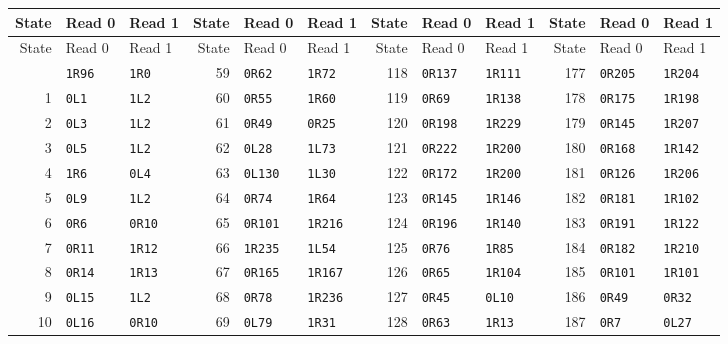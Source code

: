 \begingroup\footnotesize
\renewcommand{\arraystretch}{0.93}
\setlength{\tabcolsep}{4.5pt}
\begin{longtable}{rllrllrllrll}
\toprule
State & Read 0 & Read 1 & State & Read 0 & Read 1 & State & Read 0 & Read 1 & State & Read 0 & Read 1\\
\midrule
\endfirsthead
\toprule
State & Read 0 & Read 1 & State & Read 0 & Read 1 & State & Read 0 & Read 1 & State & Read 0 & Read 1\\
\midrule
\endhead
\bottomrule
\endfoot
0 & \texttt{1R96} & \texttt{1R0} & 59 & \texttt{0R62} & \texttt{1R72} & 118 & \texttt{0R137} & \texttt{1R111} & 177 & \texttt{0R205} & \texttt{1R204}\\
1 & \texttt{0L1} & \texttt{1L2} & 60 & \texttt{0R55} & \texttt{1R60} & 119 & \texttt{0R69} & \texttt{1R138} & 178 & \texttt{0R175} & \texttt{1R198}\\
2 & \texttt{0L3} & \texttt{1L2} & 61 & \texttt{0R49} & \texttt{0R25} & 120 & \texttt{0R198} & \texttt{1R229} & 179 & \texttt{0R145} & \texttt{1R207}\\
3 & \texttt{0L5} & \texttt{1L2} & 62 & \texttt{0L28} & \texttt{1L73} & 121 & \texttt{0R222} & \texttt{1R200} & 180 & \texttt{0R168} & \texttt{1R142}\\
4 & \texttt{1R6} & \texttt{0L4} & 63 & \texttt{0L130} & \texttt{1L30} & 122 & \texttt{0R172} & \texttt{1R200} & 181 & \texttt{0R126} & \texttt{1R206}\\
5 & \texttt{0L9} & \texttt{1L2} & 64 & \texttt{0R74} & \texttt{1R64} & 123 & \texttt{0R145} & \texttt{1R146} & 182 & \texttt{0R181} & \texttt{1R102}\\
6 & \texttt{0R6} & \texttt{0R10} & 65 & \texttt{0R101} & \texttt{1R216} & 124 & \texttt{0R196} & \texttt{1R140} & 183 & \texttt{0R191} & \texttt{1R122}\\
7 & \texttt{0R11} & \texttt{1R12} & 66 & \texttt{1R235} & \texttt{1L54} & 125 & \texttt{0R76} & \texttt{1R85} & 184 & \texttt{0R182} & \texttt{1R210}\\
8 & \texttt{0R14} & \texttt{1R13} & 67 & \texttt{0R165} & \texttt{1R167} & 126 & \texttt{0R65} & \texttt{1R104} & 185 & \texttt{0R101} & \texttt{1R101}\\
9 & \texttt{0L15} & \texttt{1L2} & 68 & \texttt{0R78} & \texttt{1R236} & 127 & \texttt{0R45} & \texttt{0L10} & 186 & \texttt{0R49} & \texttt{0R32}\\
10 & \texttt{0L16} & \texttt{0R10} & 69 & \texttt{0L79} & \texttt{1R31} & 128 & \texttt{0R63} & \texttt{1R13} & 187 & \texttt{0R7} & \texttt{0L27}\\

\end{longtable}
